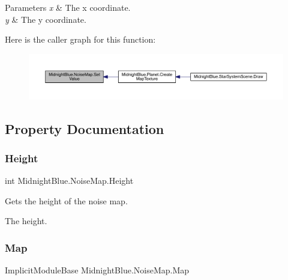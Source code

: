 \begin{DoxyParams}{Parameters}
{\em x} & The x coordinate.\\
\hline
{\em y} & The y coordinate.\\
\hline
\end{DoxyParams}
Here is the caller graph for this function\+:
\nopagebreak
\begin{figure}[H]
\begin{center}
\leavevmode
\includegraphics[width=350pt]{class_midnight_blue_1_1_noise_map_a26d94cbea4c0377833bed064cbd36496_icgraph}
\end{center}
\end{figure}


\subsection{Property Documentation}
\hypertarget{class_midnight_blue_1_1_noise_map_abfffdfa7bb7a696e495bbfb2e6ac0c57}{}\label{class_midnight_blue_1_1_noise_map_abfffdfa7bb7a696e495bbfb2e6ac0c57} 
\subsubsection{\texorpdfstring{Height}{Height}}
{\footnotesize\ttfamily int Midnight\+Blue.\+Noise\+Map.\+Height\hspace{0.3cm}{\ttfamily [get]}}



Gets the height of the noise map. 

The height.\hypertarget{class_midnight_blue_1_1_noise_map_a428d013274d19ed0775adc6d32f00719}{}\label{class_midnight_blue_1_1_noise_map_a428d013274d19ed0775adc6d32f00719} 
\subsubsection{\texorpdfstring{Map}{Map}}
{\footnotesize\ttfamily Implicit\+Module\+Base Midnight\+Blue.\+Noise\+Map.\+Map\hspace{0.3cm}{\ttfamily [get]}}



